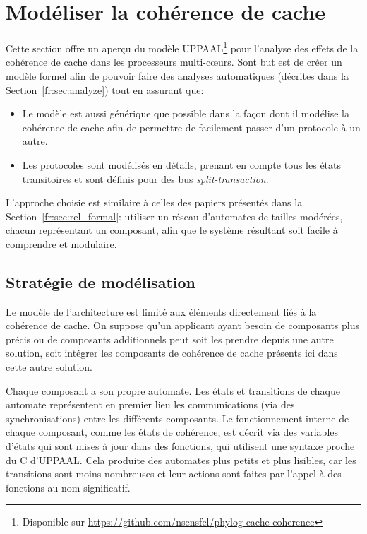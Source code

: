 \section{Mod\'eliser la coh\'erence de cache}
\label{fr:sec:model}

Cette section offre un aperçu du modèle UPPAAL\footnote{Disponible sur
\url{https://github.com/nsensfel/phylog-cache-coherence}} pour l'analyse des
effets de la cohérence de cache dans les processeurs multi-cœurs. Sont but est
de créer un modèle formel afin de pouvoir faire des analyses automatiques
(décrites dans la Section~\ref{fr:sec:analyze}) tout en assurant que:
\begin{itemize}
  \setlength{\itemsep}{0pt}%
   \setlength{\parskip}{0pt}%
\item Le modèle est aussi générique que possible dans la façon dont il modélise
la cohérence de cache afin de permettre de facilement passer d'un protocole à
un autre.
\item Les protocoles sont modélisés en détails, prenant en compte tous les états
transitoires et sont définis pour des bus \textit{split-transaction}.
\end{itemize}

L'approche choisie est similaire à celles des papiers présentés dans
la Section~\ref{fr:sec:rel_formal}: utiliser un réseau d'automates de
tailles modérées, chacun représentant un composant, afin que le système
résultant soit facile à comprendre et modulaire.

\subsection{Stratégie de modélisation}
\label{fr:sec:modeling:strategy}
Le modèle de l'architecture est limité aux éléments directement liés
à la cohérence de cache. On suppose qu'un applicant ayant besoin de
composants plus précis ou de composants additionnels peut soit les
prendre depuis une autre solution, soit intégrer les composants de
cohérence de cache présents ici dans cette autre solution.

Chaque composant a son propre automate. Les états et transitions de chaque automate représentent en premier lieu les communications (via des synchronisations) entre les différents composants. Le fonctionnement interne de chaque composant, comme les états de cohérence, est décrit via des variables d'états qui sont mises à jour dans des fonctions, qui utilisent une
syntaxe proche du C d'UPPAAL. Cela produite des automates plus
petits et plus lisibles, car les transitions sont moins nombreuses et
leur actions sont faites par l'appel à des fonctions au nom
significatif.

